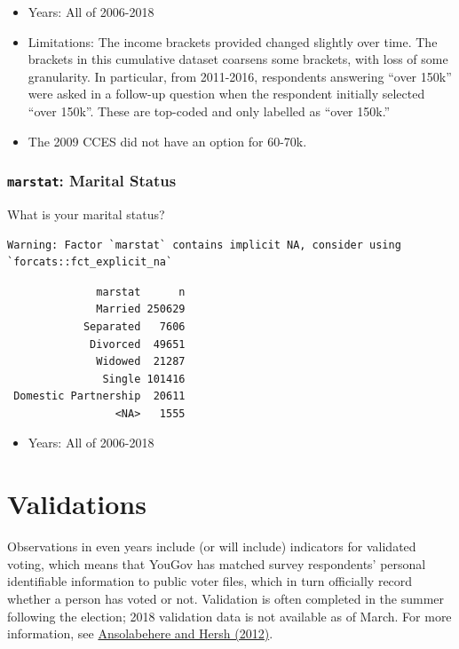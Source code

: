 \documentclass[10pt,article,oneside]{memoir}
\theoremstyle{definition}
\begin{document}
\begin{itemize}
\tightlist
\item
  Years: All of 2006-2018
\item
  Limitations: The income brackets provided changed slightly over time.
  The brackets in this cumulative dataset coarsens some brackets, with
  loss of some granularity. In particular, from 2011-2016, respondents
  answering ``over 150k'' were asked in a follow-up question when the
  respondent initially selected ``over 150k''. These are top-coded and
  only labelled as ``over 150k.''
\item
  The 2009 CCES did not have an option for 60-70k.
\end{itemize}

\hypertarget{marstat-marital-status}{%
\subsubsection{\texorpdfstring{\texttt{marstat}: Marital
Status}{marstat: Marital Status}}\label{marstat-marital-status}}

What is your marital status?

\begin{verbatim}
Warning: Factor `marstat` contains implicit NA, consider using
`forcats::fct_explicit_na`
\end{verbatim}

\begin{verbatim}
              marstat      n
              Married 250629
            Separated   7606
             Divorced  49651
              Widowed  21287
               Single 101416
 Domestic Partnership  20611
                 <NA>   1555
\end{verbatim}

\begin{itemize}
\tightlist
\item
  Years: All of 2006-2018
\end{itemize}

\newpage

\hypertarget{validations}{%
\section{Validations}\label{validations}}

Observations in even years include (or will include) indicators for
validated voting, which means that YouGov has matched survey
respondents' personal identifiable information to public voter files,
which in turn officially record whether a person has voted or not.
Validation is often completed in the summer following the election; 2018
validation data is not available as of March. For more information, see
\href{https://doi.org/10.1093/pan/mps023}{Ansolabehere and Hersh
(2012)}.
\end{document}
